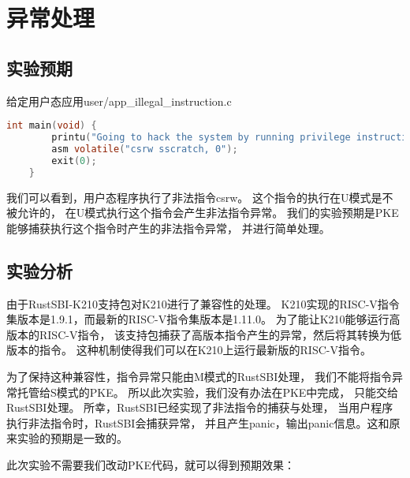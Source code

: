 \section{异常处理}

\subsection{实验预期}

给定用户态应用user/app\_illegal\_instruction.c

\begin{lstlisting}[caption={用户态应用app\_illegal\_instruction.c}, label={lst:app_illegal_instruction}, language=C]
    int main(void) {
        printu("Going to hack the system by running privilege instructions.\n");
        asm volatile("csrw sscratch, 0");
        exit(0);
    }
\end{lstlisting}

我们可以看到，用户态程序执行了非法指令csrw。
这个指令的执行在U模式是不被允许的，
在U模式执行这个指令会产生非法指令异常。
我们的实验预期是PKE能够捕获执行这个指令时产生的非法指令异常，
并进行简单处理。

\subsection{实验分析}

由于RustSBI-K210支持包对K210进行了兼容性的处理。
K210实现的RISC-V指令集版本是1.9.1，而最新的RISC-V指令集版本是1.11.0。
为了能让K210能够运行高版本的RISC-V指令，
该支持包捕获了高版本指令产生的异常，然后将其转换为低版本的指令。
这种机制使得我们可以在K210上运行最新版的RISC-V指令。

为了保持这种兼容性，指令异常只能由M模式的RustSBI处理，
我们不能将指令异常托管给S模式的PKE。
所以此次实验，我们没有办法在PKE中完成，
只能交给RustSBI处理。
所幸，RustSBI已经实现了非法指令的捕获与处理，
当用户程序执行非法指令时，RustSBI会捕获异常，
并且产生panic，输出panic信息。这和原来实验的预期是一致的。

此次实验不需要我们改动PKE代码，就可以得到预期效果：

